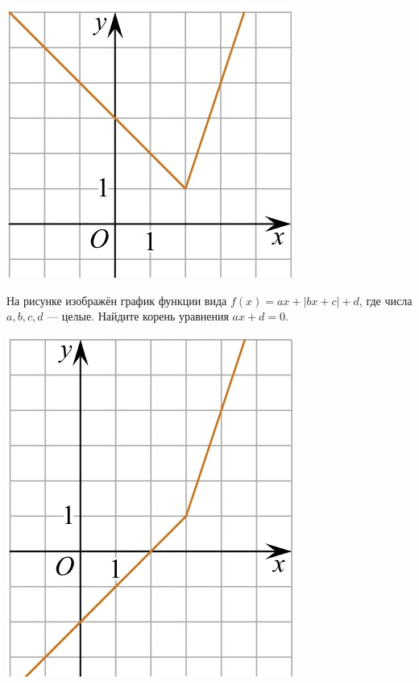 \begin{class}[number=5]
\begin{listofex}
\begin{minipage}[c]{0.17\textwidth}
			\includegraphics[align=t, width=\textwidth]{pics/G101M4C5-7.jpg}
		\end{minipage}
		\item
		\begin{minipage}[t]{0.76\textwidth}
			На рисунке изображён график функции вида \(f(x)=ax+|bx+c|+d\), где числа \(a, b, c, d\) --- целые. Найдите корень уравнения \(ax+d=0\).
		\end{minipage}
		\begin{minipage}[c]{0.17\textwidth}
			\includegraphics[align=t, width=\textwidth]{pics/G101M4C5-8.jpg}

\end{minipage}
\end{listofex}
\end{class}
